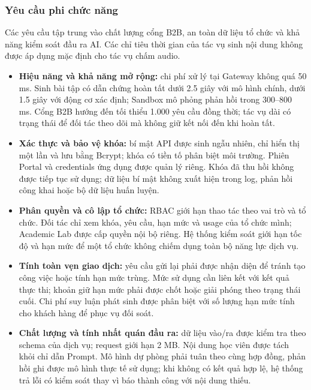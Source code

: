 \subsubsection{Yêu cầu phi chức năng}
Các yêu cầu tập trung vào chất lượng cổng B2B, an toàn dữ liệu tổ chức và khả năng kiểm soát đầu ra AI. Các chỉ tiêu thời gian của tác vụ sinh nội dung không được áp dụng mặc định cho tác vụ chấm audio.

\begin{itemize}
\item \textbf{Hiệu năng và khả năng mở rộng:} chi phí xử lý tại Gateway không quá 50 ms. Sinh bài tập có dẫn chứng hoàn tất dưới 2.5 giây với mô hình chính, dưới 1.5 giây với động cơ xác định; Sandbox mô phỏng phản hồi trong 300--800 ms. Cổng B2B hướng đến tối thiểu 1.000 yêu cầu đồng thời; tác vụ dài có trạng thái để đối tác theo dõi mà không giữ kết nối đến khi hoàn tất.

\item \textbf{Xác thực và bảo vệ khóa:} bí mật API được sinh ngẫu nhiên, chỉ hiển thị một lần và lưu bằng Bcrypt; khóa có tiền tố phân biệt môi trường. Phiên Portal và credentials ứng dụng được quản lý riêng. Khóa đã thu hồi không được tiếp tục sử dụng; dữ liệu bí mật không xuất hiện trong log, phản hồi công khai hoặc bộ dữ liệu huấn luyện.

\item \textbf{Phân quyền và cô lập tổ chức:} RBAC giới hạn thao tác theo vai trò và tổ chức. Đối tác chỉ xem khóa, yêu cầu, hạn mức và usage của tổ chức mình; Academic Lab được cấp quyền nội bộ riêng. Hệ thống kiểm soát giới hạn tốc độ và hạn mức để một tổ chức không chiếm dụng toàn bộ năng lực dịch vụ.

\item \textbf{Tính toàn vẹn giao dịch:} yêu cầu gửi lại phải được nhận diện để tránh tạo công việc hoặc tính hạn mức trùng. Mức sử dụng cần liên kết với kết quả thực thi; khoản giữ hạn mức phải được chốt hoặc giải phóng theo trạng thái cuối. Chi phí suy luận phát sinh được phân biệt với số lượng hạn mức tính cho khách hàng để phục vụ đối soát.

\item \textbf{Chất lượng và tính nhất quán đầu ra:} dữ liệu vào/ra được kiểm tra theo schema của dịch vụ; request giới hạn 2 MB. Nội dung học viên được tách khỏi chỉ dẫn Prompt. Mô hình dự phòng phải tuân theo cùng hợp đồng, phản hồi ghi được mô hình thực tế sử dụng; khi không có kết quả hợp lệ, hệ thống trả lỗi có kiểm soát thay vì báo thành công với nội dung thiếu.


\end{itemize}
